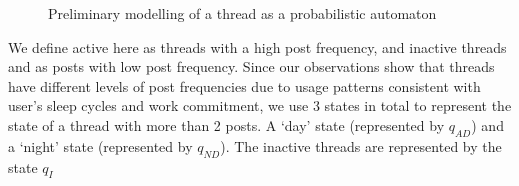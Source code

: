 \documentclass[12 pt]{article}
\begin{document}
\begin{figure}
	\begin{center}

\end{center}
	\caption{Preliminary modelling of a thread as a probabilistic automaton}\label{spaceship}
\end{figure}
We define active here as threads with a high post frequency, and inactive threads and as posts with low post frequency. Since our observations show that threads have different levels of post frequencies due to usage patterns consistent with user's sleep cycles and work commitment, we use 3 states in total to represent the state of a thread with more than 2 posts. A `day' state (represented by $q_{AD}$) and a `night' state (represented by $q_{ND}$). The inactive threads are represented by the state $q_I$
\end{document}
